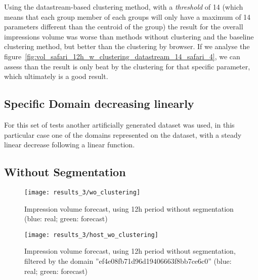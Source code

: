 Using the datastream-based clustering method, with a \emph{threshold} of 14
(which means that each group member of each groups will only have a maximum of 14
parameters different than the centroid of the group) the result for the overall
impressions volume was worse than methods without clustering and the baseline clustering
method, but better than the clustering by browser. If we analyse the
figure~\ref{fig:vol_safari_12h_w_clustering_datastream_14_safari_4}, we can
assess than the result is only beat by the clustering for that specific
parameter, which ultimately is a good result.

\subsection{Specific Domain decreasing linearly}

For this set of tests another artificially generated dataset was used, in this
particular case one of the domains represented on the dataset, with a steady linear decrease following a linear function.

\subsection*{Without Segmentation}

\begin{figure}[!ht]
\centering
\begin{minipage}[t]{0.45\linewidth}
\texttt{[image: results\_3/wo\_clustering]} \caption[Volume
impression forecast, without segmentation]{Impression volume
forecast, using 12h period without segmentation (blue: real; green: forecast)}
\label{fig:vol_domain_wo_segmentation}
\end{minipage}
\quad
\begin{minipage}[t]{0.45\linewidth}
\texttt{[image: results\_3/host\_wo\_clustering]} \caption[Volume
impression forecast, without segmentation]{Impression volume
forecast, using 12h period without segmentation, filtered by the domain ''ef4e08fb71d96d19406663f8bb7ce6c0'' (blue: real; green: forecast)}
\label{fig:vol_domain_wo_segmentation_filtered}
\end{minipage}

\end{figure}

